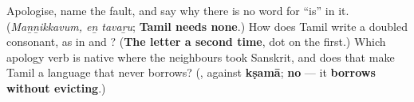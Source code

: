 \begin{tcolorbox}[breakable,colback=teal!4,colframe=teal!35!black,title={Before you move on}]
Apologise, name the fault, and say why there is no word for \textquotedblleft{}is\textquotedblright{} in it. (\emph{Maṉṉikkavum, eṉ tavaṟu}; \textbf{Tamil needs none}.) How does Tamil write a doubled consonant, as in \textbf{} and \textbf{}? (\textbf{The letter a second time}, dot on the first.) Which apology verb is native where the neighbours took Sanskrit, and does that make Tamil a language that never borrows? (\textbf{}, against \textbf{kṣamā}; \textbf{no} — it \textbf{borrows without evicting}.)
\end{tcolorbox}
